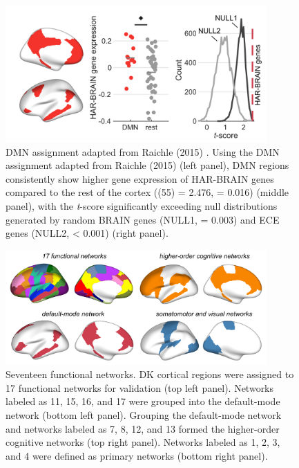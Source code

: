 \begin{refsection}
\begin{figure}[H]
    \centering
    \includegraphics[width=10cm]{images/harFigS10.png}
    \caption{DMN assignment adapted from Raichle (2015) \citep{raichle2015brain}. Using the DMN assignment adapted from Raichle (2015) (left panel), DMN regions consistently show higher gene expression of HAR-BRAIN genes compared to the rest of the cortex (\tvaldf(55) = 2.476, \pval = 0.016) (middle panel), with the \textit{t}-score significantly exceeding null distributions generated by random BRAIN genes (NULL1, \pval = 0.003) and ECE genes (NULL2, \pval < 0.001) (right panel).}
    \label{harFigs10}
\end{figure}

\begin{figure}[H]
    \centering
    \includegraphics[width=10cm]{images/harFigS11.png}
    \caption{Seventeen functional networks. DK cortical regions were assigned to 17 functional networks for validation (top left panel). Networks labeled as 11, 15, 16, and 17 were grouped into the default-mode network (bottom left panel). Grouping the default-mode network and networks labeled as 7, 8, 12, and 13 formed the higher-order cognitive networks (top right panel). Networks labeled as 1, 2, 3, and 4 were defined as primary networks (bottom right panel).}
    \label{harFigs11}
\end{figure}


\end{refsection}
